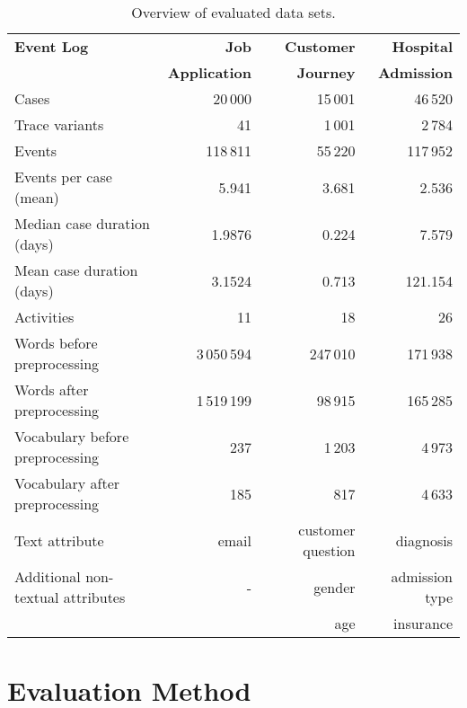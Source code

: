 \begin{table}[!htbp]
	\begin{tabularx}{\textwidth}{l r r r}
		\toprule
		\textbf{Event Log} & \textbf{Job} & \textbf{Customer} &\textbf{Hospital}  \\
		 & \textbf{Application} & \textbf{Journey} &\textbf{Admission}  \\
		\midrule
		Cases & 20\,000& 15\,001& 46\,520\\
		Trace variants &41 & 1\,001 &2\,784 \\
		Events & 118\,811 & 55\,220 & 117\,952\\
		Events per case (mean) & 5.941& 3.681& 2.536\\
		Median case duration (days) & 1.9876 & 0.224& 7.579\\
		Mean case duration (days)& 3.1524 &  0.713 & 121.154\\
		Activities & 11 & 18 & 26\\
		Words before preprocessing & 3\,050\,594 &247\,010 &  171\,938\\
		Words after preprocessing  &1\,519\,199 &98\,915 & 165\,285\\
		Vocabulary before preprocessing & 237 & 1\,203 & 4\,973 \\
		Vocabulary after preprocessing & 185 & 817 & 4\,633\\
		Text attribute & email& customer question & diagnosis\\
		Additional non-textual attributes & - & gender& admission type\\
		 &  & age& insurance\\
		\bottomrule
	\end{tabularx}
	\caption[Overview of evaluated data sets]{Overview of evaluated data sets.}
	\label{tab:logs}
\end{table}

\section{Evaluation Method}

